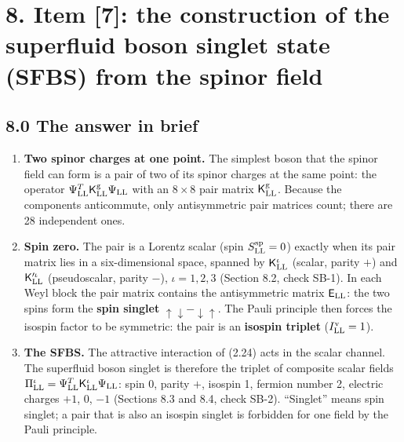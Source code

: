 \documentclass[
  10pt,
]{article}
\providecommand{\tightlist}{%
  \setlength{\itemsep}{0pt}\setlength{\parskip}{0pt}}
\begin{document}
\hypertarget{item-7-the-construction-of-the-superfluid-boson-singlet-state-sfbs-from-the-spinor-field}{%
\section{8. Item {[}7{]}: the construction of the superfluid boson
singlet state (SFBS) from the spinor
field}\label{item-7-the-construction-of-the-superfluid-boson-singlet-state-sfbs-from-the-spinor-field}}

\hypertarget{the-answer-in-brief-6}{%
\subsection{8.0 The answer in brief}\label{the-answer-in-brief-6}}

\begin{enumerate}
\def\labelenumi{\arabic{enumi}.}
\tightlist
\item
  \textbf{Two spinor charges at one point.} The simplest boson that the
  spinor field can form is a pair of two of its spinor charges at the
  same point: the operator
  \(\Psi^T_{\rm LL}\mathsf K^{\rm g}_{\rm LL}\Psi_{\rm LL}\) with an
  \(8\times8\) pair matrix \(\mathsf K^{\rm g}_{\rm LL}\). Because the
  components anticommute, only antisymmetric pair matrices count; there
  are 28 independent ones.
\item
  \textbf{Spin zero.} The pair is a Lorentz scalar (spin
  \(S^{\rm sp}_{\rm LL}=0\)) exactly when its pair matrix lies in a
  six-dimensional space, spanned by \(\mathsf K^\iota_{\rm LL}\)
  (scalar, parity \(+\)) and \(\mathsf K'^\iota_{\rm LL}\)
  (pseudoscalar, parity \(-\)), \(\iota=1,2,3\) (Section 8.2, check
  SB-1). In each Weyl block the pair matrix contains the antisymmetric
  matrix \(\mathsf E_{\rm LL}\): the two spins form the \textbf{spin
  singlet} \(\uparrow\downarrow-\downarrow\uparrow\). The Pauli
  principle then forces the isospin factor to be symmetric: the pair is
  an \textbf{isospin triplet} (\(I^{\rm v}_{\rm LL}=1\)).
\item
  \textbf{The SFBS.} The attractive interaction of (2.24) acts in the
  scalar channel. The superfluid boson singlet is therefore the triplet
  of composite scalar fields
  \(\Pi^\iota_{\rm LL}=\Psi^T_{\rm LL}\mathsf K^\iota_{\rm LL}\Psi_{\rm LL}\):
  spin 0, parity \(+\), isospin 1, fermion number 2, electric charges
  \(+1\), \(0\), \(-1\) (Sections 8.3 and 8.4, check SB-2). ``Singlet''
  means spin singlet; a pair that is also an isospin singlet is
  forbidden for one field by the Pauli principle.

\end{enumerate}
\end{document}
